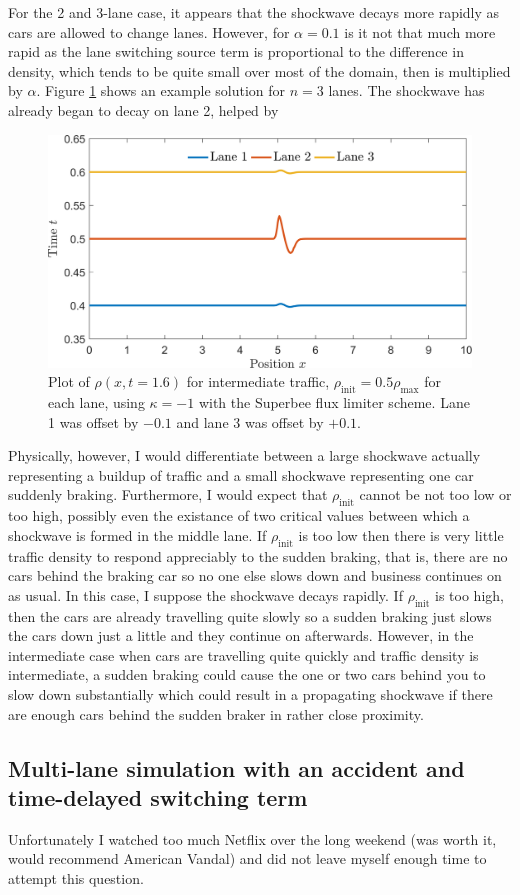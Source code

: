\documentclass[11pt]{article}
\begin{document}
For the 2 and 3-lane case, it appears that the shockwave decays more rapidly as cars are allowed to change lanes. However, for $\alpha=0.1$ is it not that much more rapid as the lane switching source term is proportional to the difference in density, which tends to be quite small over most of the domain, then is multiplied by $\alpha$. Figure \ref{fig:q3a_3lanes} shows an example solution for $n=3$ lanes. The shockwave has already began to decay on lane 2, helped by 

\begin{figure}[h!]
  \centering
  \includegraphics[width=\textwidth]{q3a_3lanes.png}
  \caption{Plot of $\rho(x,t=1.6)$ for intermediate traffic, $\rho_\mathrm{init} = 0.5\rho_\mathrm{max}$ for each lane, using $\kappa=-1$ with the Superbee flux limiter scheme. Lane 1 was offset by $-0.1$ and lane 3 was offset by $+0.1$.}
  \label{fig:q3a_3lanes}
\end{figure}

Physically, however, I would differentiate between a large shockwave actually representing a buildup of traffic and a small shockwave representing one car suddenly braking. Furthermore, I would expect that $\rho_\mathrm{init}$ cannot be not too low or too high, possibly even the existance of two critical values between which a shockwave is formed in the middle lane. If $\rho_\mathrm{init}$ is too low then there is very little traffic density to respond appreciably to the sudden braking, that is, there are no cars behind the braking car so no one else slows down and business continues on as usual. In this case, I suppose the shockwave decays rapidly. If $\rho_\mathrm{init}$ is too high, then the cars are already travelling quite slowly so a sudden braking just slows the cars down just a little and they continue on afterwards. However, in the intermediate case when cars are travelling quite quickly and traffic density is intermediate, a sudden braking could cause the one or two cars behind you to slow down substantially which could result in a propagating shockwave if there are enough cars behind the sudden braker in rather close proximity.

\subsection{Multi-lane simulation with an accident and time-delayed switching term}
Unfortunately I watched too much Netflix over the long weekend (was worth it, would recommend American Vandal) and did not leave myself enough time to attempt this question.
\end{document}
